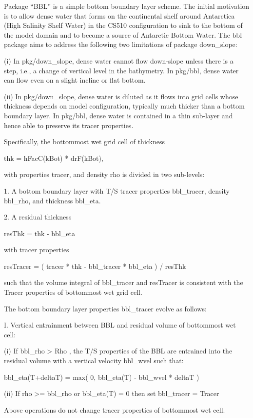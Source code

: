 Package ``BBL'' is a simple bottom boundary layer scheme.  The initial
motivation is to allow dense water that forms on the continental shelf around
Antarctica (High Salinity Shelf Water) in the CS510 configuration to sink to
the bottom of the model domain and to become a source of Antarctic Bottom
Water.  The bbl package aims to address the following two limitations of
package down_slope:

(i) In pkg/down_slope, dense water cannot flow down-slope unless there is a
step, i.e., a change of vertical level in the bathymetry.  In pkg/bbl, dense
water can flow even on a slight incline or flat bottom.

(ii) In pkg/down_slope, dense water is diluted as it flows into grid cells
whose thickness depends on model configuration, typically much thicker than a
bottom boundary layer.  In pkg/bbl, dense water is contained in a thin
sub-layer and hence able to preserve its tracer properties.

Specifically, the bottommost wet grid cell of thickness

    thk = hFacC(kBot) * drF(kBot),

with properties tracer, and density rho is divided in two sub-levels:

1. A bottom boundary layer with T/S tracer properties bbl_tracer,
density bbl_rho, and thickness bbl_eta.

2. A residual thickness

    resThk = thk - bbl_eta

with tracer properties

    resTracer = ( tracer * thk - bbl_tracer * bbl_eta ) / resThk

such that the volume integral of bbl_tracer and resTracer is consistent with
the Tracer properties of bottommost wet grid cell.

The bottom boundary layer properties bbl_tracer evolve as follows:

I. Vertical entrainment between BBL and residual volume of bottommost wet cell:

(i) If bbl_rho > Rho , the T/S properties of the BBL are entrained into
the residual volume with a vertical velocity bbl_wvel such that:

    bbl_eta(T+deltaT) = max( 0, bbl_eta(T) - bbl_wvel * deltaT )

(ii) If rho >= bbl_rho or bbl_eta(T) = 0 then set bbl_tracer = Tracer

Above operations do not change tracer properties of bottommost wet cell.

